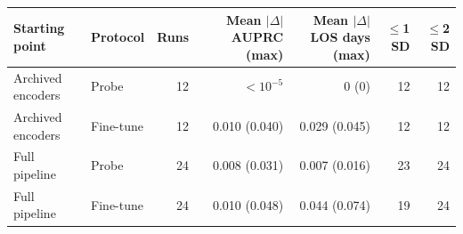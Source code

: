 \begin{tabular}{llrrrrr}
\toprule
Starting point & Protocol & Runs & Mean $|\Delta|$ AUPRC (max) & Mean $|\Delta|$ LOS days (max) & $\leq$1 SD & $\leq$2 SD \\
\midrule
Archived encoders & Probe & 12 & $<10^{-5}$ & 0 (0) & 12 & 12 \\
Archived encoders & Fine-tune & 12 & 0.010 (0.040) & 0.029 (0.045) & 12 & 12 \\
Full pipeline & Probe & 24 & 0.008 (0.031) & 0.007 (0.016) & 23 & 24 \\
Full pipeline & Fine-tune & 24 & 0.010 (0.048) & 0.044 (0.074) & 19 & 24 \\
\bottomrule
\end{tabular}
